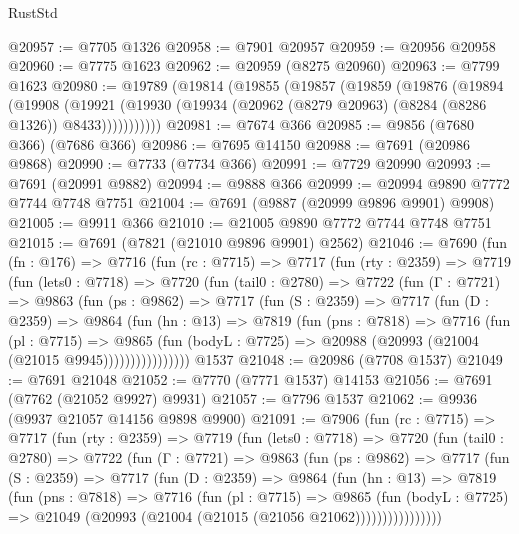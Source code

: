\begin{lexlean}{RustStd}
\begin{coremodule}
@20957 := @7705 @1326
@20958 := @7901 @20957
@20959 := @20956 @20958
@20960 := @7775 @1623
@20962 := @20959 (@8275 @20960)
@20963 := @7799 @1623
@20980 := @19789
    (@19814
      (@19855
        (@19857
          (@19859
            (@19876
              (@19894
                (@19908
                  (@19921
                    (@19930 (@19934 (@20962 (@8279 @20963) (@8284 (@8286 @1326)) @8433)))))))))))
@20981 := @7674 @366
@20985 := @9856 (@7680 @366) (@7686 @366)
@20986 := @7695 @14150
@20988 := @7691 (@20986 @9868)
@20990 := @7733 (@7734 @366)
@20991 := @7729 @20990
@20993 := @7691 (@20991 @9882)
@20994 := @9888 @366
@20999 := @20994 @9890 @7772 @7744 @7748 @7751
@21004 := @7691 (@9887 (@20999 @9896 @9901) @9908)
@21005 := @9911 @366
@21010 := @21005 @9890 @7772 @7744 @7748 @7751
@21015 := @7691 (@7821 (@21010 @9896 @9901) @2562)
@21046 := @7690
    (fun (fn : @176) =>
    @7716
      (fun (rc : @7715) =>
      @7717
        (fun (rty : @2359) =>
        @7719
          (fun (lets0 : @7718) =>
          @7720
            (fun (tail0 : @2780) =>
            @7722
              (fun (Γ : @7721) =>
              @9863
                (fun (ps : @9862) =>
                @7717
                  (fun (S : @2359) =>
                  @7717
                    (fun (D : @2359) =>
                    @9864
                      (fun (hn : @13) =>
                      @7819
                        (fun (pns : @7818) =>
                        @7716
                          (fun (pl : @7715) =>
                          @9865
                            (fun (bodyL : @7725) =>
                            @20988 (@20993 (@21004 (@21015 @9945))))))))))))))))
    @1537
@21048 := @20986 (@7708 @1537)
@21049 := @7691 @21048
@21052 := @7770 (@7771 @1537) @14153
@21056 := @7691 (@7762 (@21052 @9927) @9931)
@21057 := @7796 @1537
@21062 := @9936 (@9937 @21057 @14156 @9898 @9900)
@21091 := @7906
    (fun (rc : @7715) =>
    @7717
      (fun (rty : @2359) =>
      @7719
        (fun (lets0 : @7718) =>
        @7720
          (fun (tail0 : @2780) =>
          @7722
            (fun (Γ : @7721) =>
            @9863
              (fun (ps : @9862) =>
              @7717
                (fun (S : @2359) =>
                @7717
                  (fun (D : @2359) =>
                  @9864
                    (fun (hn : @13) =>
                    @7819
                      (fun (pns : @7818) =>
                      @7716
                        (fun (pl : @7715) =>
                        @9865
                          (fun (bodyL : @7725) =>
                          @21049 (@20993 (@21004 (@21015 (@21056 @21062))))))))))))))))

\end{coremodule}
\end{lexlean}
